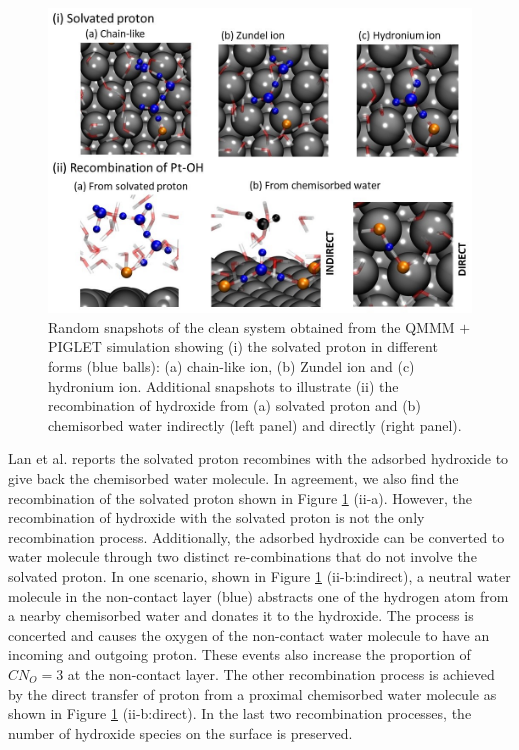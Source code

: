 \begin{figure}
   \begin{center}
    \includegraphics[width=15cm]{./Chapter3/figures/slide9.JPG}       
   \end{center}
    \caption{Random snapshots of the clean system obtained from the QMMM $+$ PIGLET simulation showing (i) the solvated proton in different forms (blue balls): (a) chain-like ion, (b) Zundel ion and (c) hydronium ion. Additional snapshots to illustrate (ii) the recombination of hydroxide from (a) solvated proton and (b) chemisorbed water indirectly (left panel) and directly (right panel).}
  \label{fig:Slide9}
\end{figure}

Lan et al.\cite{lan2020ionization} reports the solvated proton recombines with the adsorbed hydroxide to give back the chemisorbed water molecule. In agreement, we also find the recombination of the solvated proton shown in Figure \ref{fig:Slide9} (ii-a). However, the recombination of hydroxide with the solvated proton is not the only recombination process. Additionally, the adsorbed hydroxide can be converted to water molecule through two distinct re-combinations that do not involve the solvated proton. In one scenario, shown in Figure \ref{fig:Slide9} (ii-b:indirect), a neutral water molecule in the non-contact layer (blue) abstracts one of the hydrogen atom from a nearby chemisorbed water and donates it to the hydroxide. The process is concerted and causes the oxygen of the non-contact water molecule to have an incoming and outgoing proton. These events also increase the proportion of $CN_{O} = 3$ at the non-contact layer. The other recombination process is achieved by the direct transfer of proton from a proximal chemisorbed water molecule as shown in Figure \ref{fig:Slide9} (ii-b:direct). In the last two recombination processes, the number of hydroxide species on the surface is preserved.  

